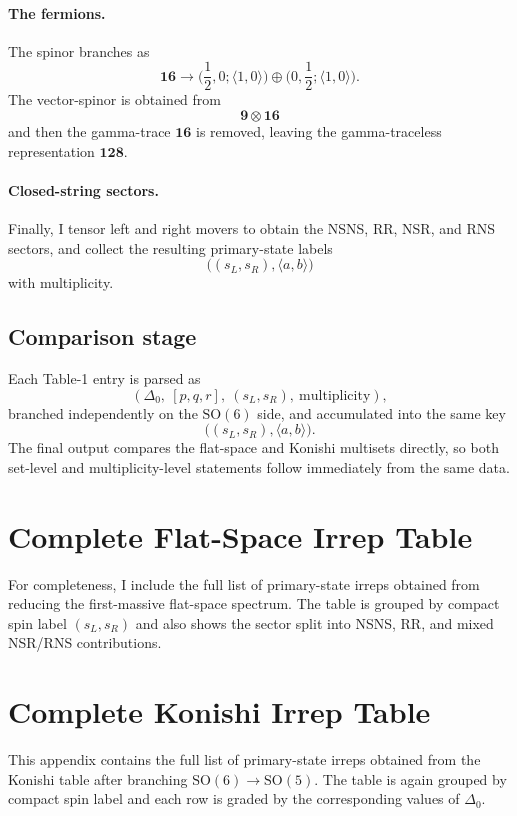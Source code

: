 \documentclass[12pt]{article}
\newcommand{\SO}{\mathrm{SO}}
\newcommand{\D}{\Delta}
\newcommand{\la}{\langle}
\newcommand{\ra}{\rangle}
\newcommand{\bb}{\mathbf}
\newcommand{\half}{\frac{1}{2}}
\begin{document}
\paragraph{The fermions.}
The spinor branches as
\begin{equation}
\bb{16}\to \Big(\half,0;\la 1,0\ra\Big)\oplus \Big(0,\half;\la 1,0\ra\Big).
\end{equation}
The vector-spinor is obtained from
\begin{equation}
\bb 9\otimes \bb{16}
\end{equation}
and then the gamma-trace $\bb{16}$ is removed, leaving the gamma-traceless
representation $\bb{128}$.

\paragraph{Closed-string sectors.}
Finally, I tensor left and right movers to obtain the NSNS, RR, NSR, and RNS sectors, and
collect the resulting primary-state labels
\begin{equation}
\big((s_L,s_R),\la a,b\ra\big)
\end{equation}
with multiplicity.

\subsection{Comparison stage}

Each Table-1 entry is parsed as
\begin{equation}
(\D_0,\ [p,q,r],\ (s_L,s_R),\ \text{multiplicity}),
\end{equation}
branched independently on the $\SO(6)$ side, and accumulated into the same key
\begin{equation}
\big((s_L,s_R),\la a,b\ra\big).
\end{equation}
The final output compares the flat-space and Konishi multisets directly, so both set-level
and multiplicity-level statements follow immediately from the same data.

\clearpage
\section{Complete Flat-Space Irrep Table}

For completeness, I include the full list of primary-state irreps obtained from reducing the
first-massive flat-space spectrum. The table is grouped by compact spin label $(s_L,s_R)$ and
also shows the sector split into NSNS, RR, and mixed NSR/RNS contributions.

\begingroup

\endgroup

\clearpage
\section{Complete Konishi Irrep Table}

This appendix contains the full list of primary-state irreps obtained from the Konishi table
after branching $\SO(6)\to \SO(5)$. The table is again grouped by compact spin label and each
row is graded by the corresponding values of $\D_0$.

\begingroup

\endgroup
\end{document}
